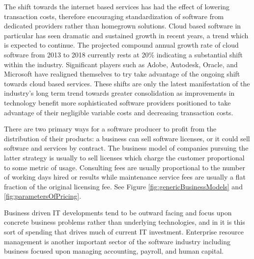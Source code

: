 The shift towards the internet based services has had the effect of lowering transaction costs, therefore encouraging standardization of software from dedicated providers rather than homegrown solutions.\autocite[46]{buxmann2012software}\autocite[]{SurveysSoftware2015}
Cloud based software in particular has seen dramatic and sustained growth in recent years, a trend which is expected to continue.
The projected compound annual growth rate of cloud software from 2013 to 2018 currently rests at 20\% indicating a substantial shift within the industry. Significant players such as Adobe, Autodesk, Oracle, and Microsoft have realigned themselves to try take advantage of the ongoing shift towards cloud based services.\autocite[40]{SurveysSoftware2015}
These shifts are only the latest manifestation of the industry's long term trend towards greater consolidation as improvements in technology benefit more sophisticated software providers positioned to take advantage of their negligible variable costs and decreasing transaction costs.\autocite[14]{buxmann2012software}

There are two primary ways for a software producer to profit from the distribution of their products: a business can sell software licenses, or it could sell software and services by contract.\autocite[]{ValuelineOverview}
The business model of companies pursuing the latter strategy is usually to sell licenses which charge the customer proportional to some metric of usage.\autocite[14]{buxmann2012software}
Consulting fees are usually proportional to the number of working days hired or results while maintenance service fees are usually a flat fraction of the original licensing fee.\autocite[16]{buxmann2012software} See Figure \ref{fig:genericBusinessModels} and \ref{fig:parametersOfPricing}.

Business driven IT developments tend to be outward facing and focus upon concrete business problems rather than underlying technologies, and in it is this sort of spending that drives much of current IT investment.\autocite[]{NextGenBusinessSoftware}
Enterprise resource management is another important sector of the software industry including business focused upon managing accounting, payroll, and human capital.\autocite[46]{SurveysSoftware2015}

